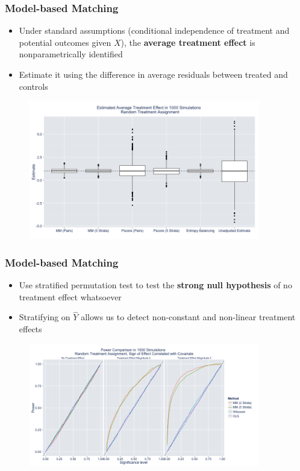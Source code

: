 \documentclass{beamer}
\begin{document}
\frame
{
  \frametitle{Model-based Matching}
\begin{center}
\begin{itemize}
\item Under standard assumptions (conditional independence of treatment and potential outcomes given $X$), the \textbf{average treatment effect} is nonparametrically identified
\item Estimate it using the difference in average residuals between treated and controls
\end{itemize}

\begin{figure}[htbp]
\begin{center}
\includegraphics[width = 0.9\textwidth]{fig/estimates.png}

\end{center}
\end{figure}


\end{center}
}

\frame
{
  \frametitle{Model-based Matching}
\begin{center}
\begin{itemize}
\item Use stratified permutation test to test the \textbf{strong null hypothesis} of no treatment effect whatsoever
\item Stratifying on $\hat{Y}$ allows us to detect non-constant and non-linear treatment effects
\end{itemize}

\begin{figure}[htbp]
\begin{center}
\includegraphics[width = 0.9\textwidth]{fig/power.png}
\end{center}
\end{figure}


\end{center}
}
\end{document}
